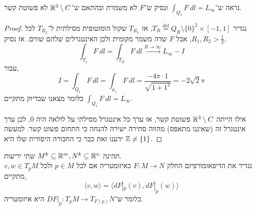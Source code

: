 \subquestion{}
נראה ש־$\int_{Q_1} F\ dl = L_{\infty}$ ונסיק ש־$F$ לא משמרת ובהתאם ש־$\mathbb{R}^3 \setminus C$ לא פשוטת קשר.
\begin{proof}
	נגדיר $T_R \overset{\operatorname{def}}{=} Q_R \setminus {\{ 0 \}}^2 \times [-1, 1]$, אז $T_{R_1}$ שקול הומוטופית מסילתית ל־$T_{R_2}$ לכל $R_1, R_2 > \frac{1}{2}$, אבל $F$ שדה משמר מקומית ולכן האינטגרלים שלהם שווים.
	אז נסיק,
	\[
		\int_{T_1} F\ dl
		= \int_{T_R} F\ dl
		\xrightarrow{R \to \infty} L_{\infty} - I
	\]
	עבור,
	\[
		I = \int_{Q_1} F\ dl
		= \int_{\mu_1} F\ dl
		= \frac{-4 \pi \cdot 1}{\sqrt{1 + 1^2}}
		= - 2 \sqrt{2} \pi
	\]
	כלומר מצאנו שבדיוק מתקיים $\int_{Q_1} F\ dl = L_{\infty}$.

	אילו הייתה $\mathbb{R}^3 \setminus C$ פשוטת קשר, אז ערך כל אינטגרל מסילתי על לולאה היה $0$, לכן ערך אינטגרל זה (שאיננו מתאפס) מהווה סתירה ישירה להנחה כי התחום פשוט קשר.
	למעשה ידענו זאת כבר כי החבורה היסודית שלו היא $\mathbb{Z} \ne \{ 1 \}$.
\end{proof}

\question{}
תהינה $M^k \subseteq \mathbb{R}^m, N^k \subseteq \mathbb{R}^n$ שתי יריעות. \\
נגדיר את הדיפאומורפיזם החלק $F : M \to N$ כאיזומטריה אם לכל $p \in M$ ולכל $v, w \in T_p M$ מתקיים,
\[
	\langle v, w \rangle
	= \langle d F |_p (v), d F |_p (w) \rangle
\]
כלומר ש־$DF |_p : T_p M \to T_{F(p)} N$ היא איזומטריה.

